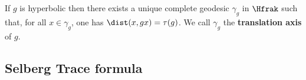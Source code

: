 

  If $g$ is hyperbolic then there exists a unique complete geodesic $\gamma_g$ in $\Hfrak$ such that, for all $x \in \gamma_g$, one has $\dist(x,gx) = \tau(g)$. We call $\gamma_g$ the \textbf{translation axis} of $g$.

\begin{proposition}[Uniformization]

\end{proposition}





\subsection{Selberg Trace formula}